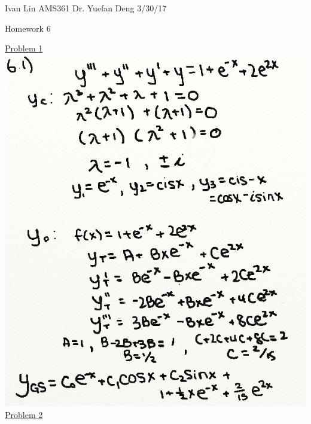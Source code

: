 \documentclass{article}
\begin{document}
Ivan Lin\newline{}
AMS361\newline{}
Dr. Yuefan Deng\newline{}
3/30/17\newline{}

\begin{center}
  Homework 6
\end{center}

\underline{Problem 1}\newline{}
\includegraphics[width=\textwidth,height=\textheight,keepaspectratio]{ams361p1.png}\clearpage{}
\underline{Problem 2}\newline{}
\end{document}
